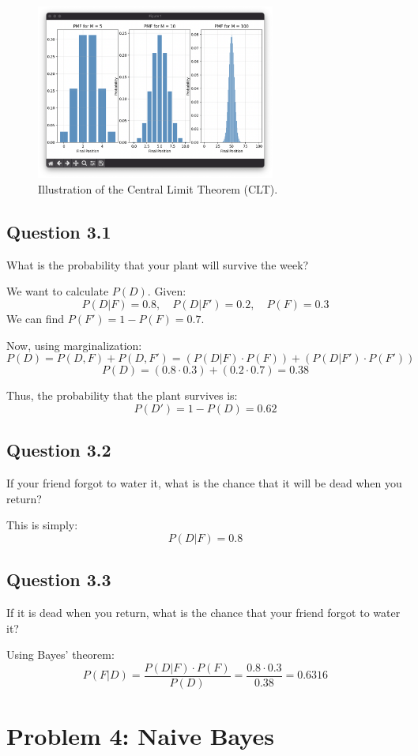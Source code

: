 \documentclass{article}
\begin{document}
\begin{figure}[h]
    \centering
    \includegraphics[width=0.7\textwidth]{clt.png}
    \caption{Illustration of the Central Limit Theorem (CLT).}
\end{figure}


\subsection{Question 3.1}
What is the probability that your plant will survive the week?

We want to calculate \( P(D) \). Given:
\[
P(D|F) = 0.8, \quad P(D|F') = 0.2, \quad P(F) = 0.3
\]
We can find \( P(F') = 1 - P(F) = 0.7 \).

Now, using marginalization:
\[
P(D) = P(D,F) + P(D,F') = (P(D|F) \cdot P(F)) + (P(D|F') \cdot P(F')) 
\]
\[
P(D) = (0.8 \cdot 0.3) + (0.2 \cdot 0.7) = 0.38
\]

Thus, the probability that the plant survives is:
\[
P(D') = 1 - P(D) = 0.62
\]

\subsection{Question 3.2}
If your friend forgot to water it, what is the chance that it will be dead when you return?

This is simply:
\[
P(D|F) = 0.8
\]

\subsection{Question 3.3}
If it is dead when you return, what is the chance that your friend forgot to water it?

Using Bayes' theorem:
\[
P(F|D) = \frac{P(D|F) \cdot P(F)}{P(D)} = \frac{0.8 \cdot 0.3}{0.38} = 0.6316
\]


\section{Problem 4: Naive Bayes}
\end{document}
